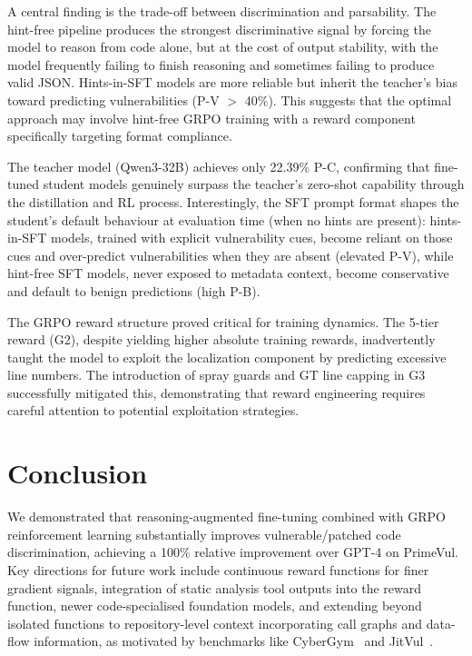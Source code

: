 \documentclass{article}
\begin{document}
A central finding is the trade-off between discrimination and parsability. The hint-free pipeline produces the strongest discriminative signal by forcing the model to reason from code alone, but at the cost of output stability, with the model frequently failing to finish reasoning and sometimes failing to produce valid JSON. Hints-in-SFT models are more reliable but inherit the teacher's bias toward predicting vulnerabilities (P-V $>$ 40\%). This suggests that the optimal approach may involve hint-free GRPO training with a reward component specifically targeting format compliance.

The teacher model (Qwen3-32B) achieves only 22.39\% P-C, confirming that fine-tuned student models genuinely surpass the teacher's zero-shot capability through the distillation and RL process. Interestingly, the SFT prompt format shapes the student's default behaviour at evaluation time (when no hints are present): hints-in-SFT models, trained with explicit vulnerability cues, become reliant on those cues and over-predict vulnerabilities when they are absent (elevated P-V), while hint-free SFT models, never exposed to metadata context, become conservative and default to benign predictions (high P-B).

The GRPO reward structure proved critical for training dynamics. The 5-tier reward (G2), despite yielding higher absolute training rewards, inadvertently taught the model to exploit the localization component by predicting excessive line numbers. The introduction of spray guards and GT line capping in G3 successfully mitigated this, demonstrating that reward engineering requires careful attention to potential exploitation strategies.

\section{Conclusion}

We demonstrated that reasoning-augmented fine-tuning combined with GRPO reinforcement learning substantially improves vulnerable/patched code discrimination, achieving a 100\% relative improvement over GPT-4 on PrimeVul. Key directions for future work include continuous reward functions for finer gradient signals, integration of static analysis tool outputs into the reward function, newer code-specialised foundation models, and extending beyond isolated functions to repository-level context incorporating call graphs and data-flow information, as motivated by benchmarks like CyberGym~\cite{cybergym} and JitVul~\cite{jitvul}.
\end{document}
